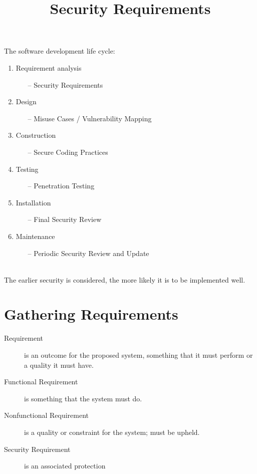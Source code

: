 \documentclass[a4paper]{article}
\begin{document}
	\title{Security Requirements}
	\maketitle
	\medskip
	The software development life cycle:
	\begin{enumerate}
		\item Requirement analysis
			\begin{itemize}
				\item[--] Security Requirements
			\end{itemize}
		\item Design
			\begin{itemize}
				\item[--] Misuse Cases / Vulnerability Mapping
			\end{itemize}
		\item Construction
			\begin{itemize}
				\item[--] Secure Coding Practices
			\end{itemize}
		\item Testing
			\begin{itemize}
				\item[--] Penetration Testing
			\end{itemize}
		\item Installation
			\begin{itemize}
				\item[--] Final Security Review
			\end{itemize}
		\item Maintenance
			\begin{itemize}
				\item[--] Periodic Security Review and Update
			\end{itemize}
	\end{enumerate}
	\\
	The earlier security is considered, the more likely it is to be implemented well.
	\section{Gathering Requirements}
	\begin{description}
		\item[Requirement] is an outcome for the proposed system, something that it must perform
			or a quality it must have.
		\item[Functional Requirement] is something that the system must do.
		\item[Nonfunctional Requirement] is a quality or constraint for the system; must be upheld.
		\item[Security Requirement] is an associated protection
	\end{description}
\end{document}
